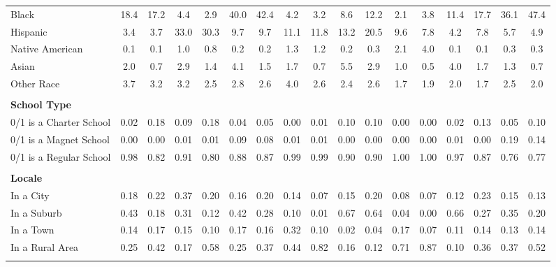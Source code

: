 \begin{tabular*}{\linewidth}{@{\extracolsep{\fill} } lcccccccccccccccc}
\hspace{0.2cm}Black&18.4&17.2&4.4&2.9&40.0&42.4&4.2&3.2&8.6&12.2&2.1&3.8&11.4&17.7&36.1&47.4\\%
\hspace{0.2cm}Hispanic&3.4&3.7&33.0&30.3&9.7&9.7&11.1&11.8&13.2&20.5&9.6&7.8&4.2&7.8&5.7&4.9\\%
\hspace{0.2cm}Native American&0.1&0.1&1.0&0.8&0.2&0.2&1.3&1.2&0.2&0.3&2.1&4.0&0.1&0.1&0.3&0.3\\%
\hspace{0.2cm}Asian&2.0&0.7&2.9&1.4&4.1&1.5&1.7&0.7&5.5&2.9&1.0&0.5&4.0&1.7&1.3&0.7\\%
\hspace{0.2cm}Other Race&3.7&3.2&3.2&2.5&2.8&2.6&4.0&2.6&2.4&2.6&1.7&1.9&2.0&1.7&2.5&2.0\\%
&&&&&&&&&&&&&&&&\\%
\multicolumn{17}{l}{\bfseries School Type}\\%
\hspace{0.2cm}0/1 is a Charter School&0.02&0.18&0.09&0.18&0.04&0.05&0.00&0.01&0.10&0.10&0.00&0.00&0.02&0.13&0.05&0.10\\%
\hspace{0.2cm}0/1 is a Magnet School&0.00&0.00&0.01&0.01&0.09&0.08&0.01&0.01&0.00&0.00&0.00&0.00&0.01&0.00&0.19&0.14\\%
\hspace{0.2cm}0/1 is a Regular School&0.98&0.82&0.91&0.80&0.88&0.87&0.99&0.99&0.90&0.90&1.00&1.00&0.97&0.87&0.76&0.77\\%
&&&&&&&&&&&&&&&&\\%
\multicolumn{17}{l}{\bfseries Locale}\\%
\hspace{0.2cm}In a City&0.18&0.22&0.37&0.20&0.16&0.20&0.14&0.07&0.15&0.20&0.08&0.07&0.12&0.23&0.15&0.13\\%
\hspace{0.2cm}In a Suburb&0.43&0.18&0.31&0.12&0.42&0.28&0.10&0.01&0.67&0.64&0.04&0.00&0.66&0.27&0.35&0.20\\%
\hspace{0.2cm}In a Town&0.14&0.17&0.15&0.10&0.17&0.16&0.32&0.10&0.02&0.04&0.17&0.07&0.11&0.14&0.13&0.14\\%
\hspace{0.2cm}In a Rural Area&0.25&0.42&0.17&0.58&0.25&0.37&0.44&0.82&0.16&0.12&0.71&0.87&0.10&0.36&0.37&0.52\\%
&&&&&&&&&&&&&&&&\\%
\hline%
\end{tabular*}